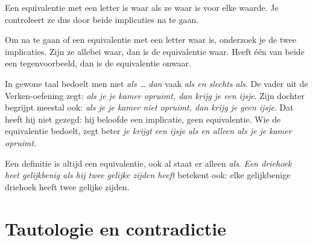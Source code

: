 Een equivalentie met een letter is waar als ze waar is voor elke waarde. Je controleert ze dus door beide implicaties na te gaan.


\begin{werkwijze}
Om na te gaan of een equivalentie met een letter waar is, onderzoek je de twee implicaties. Zijn ze allebei waar, dan is de equivalentie waar. Heeft één van beide een tegenvoorbeeld, dan is de equivalentie onwaar.
\end{werkwijze}

In gewone taal bedoelt men met \textit{als \ldots{} dan} vaak \textit{als en slechts als}. De vader uit de Verken-oefening zegt: \textit{als je je kamer opruimt, dan krijg je een ijsje}. Zijn dochter begrijpt meestal ook: \textit{als je je kamer niet opruimt, dan krijg je geen ijsje}. Dat heeft hij niet gezegd: hij beloofde een implicatie, geen equivalentie. Wie de equivalentie bedoelt, zegt beter \textit{je krijgt een ijsje als en alleen als je je kamer opruimt}.

Een definitie is altijd een equivalentie, ook al staat er alleen \textit{als}. \textit{Een driehoek heet gelijkbenig als hij twee gelijke zijden heeft} betekent ook: elke gelijkbenige driehoek heeft twee gelijke zijden.

\begin{oefeningen}
\end{oefeningen}

\section{Tautologie en contradictie}

